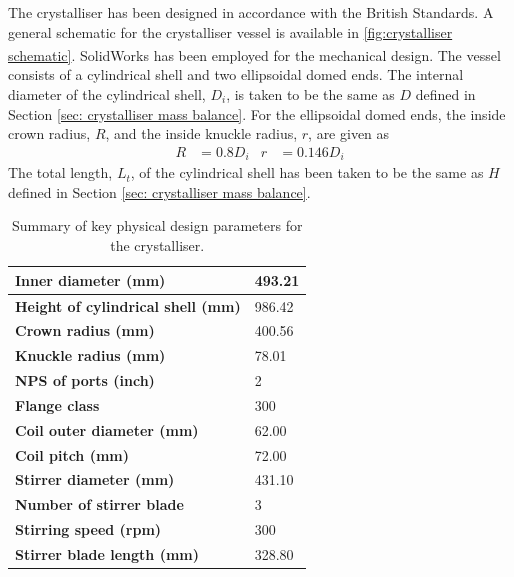 The crystalliser has been designed in accordance with the British Standards. A general schematic for the crystalliser vessel is available in \cref{fig:crystalliser schematic}.  SolidWorks\textsuperscript{\textregistered} has been employed for the mechanical design. The vessel consists of a cylindrical shell and two ellipsoidal domed ends. The internal diameter of the cylindrical shell, $D_i$, is taken to be the same as $D$ defined in Section \ref{sec: crystalliser mass balance}. For the ellipsoidal domed ends, the inside crown radius, $R$, and the inside knuckle radius, $r$, are given as 
\begin{align}
    R &= 0.8 D_i &
    r &= 0.146 D_i
\end{align}
The total length, $L_t$, of the cylindrical shell has been taken to be the same as $H$ defined in Section \ref{sec: crystalliser mass balance}. 

\begin{table}
\centering
\caption{Summary of key physical design parameters for the crystalliser.}
 \label{tab:crystalliser mech design summary}
\begin{tabular}{@{}l|l@{}}
\toprule
\textbf{Inner diameter (mm)}                &    493.21 \\ \midrule
\textbf{Height of cylindrical shell (mm)}   & 986.42 \\ \midrule
\textbf{Crown radius (mm)}                  & 400.56 \\ \midrule
\textbf{Knuckle radius (mm)}                & 78.01 \\ \midrule
\textbf{NPS of ports (inch)}                & 2 \\ \midrule
\textbf{Flange class}                       & 300 \\ \midrule
\textbf{Coil outer diameter (mm)}           & 62.00 \\ \midrule
\textbf{Coil pitch (mm)}                    & 72.00 \\ \midrule
\textbf{Stirrer diameter (mm)}              & 431.10 \\ \midrule
\textbf{Number of stirrer blade}            & 3 \\ \midrule
\textbf{Stirring speed (rpm)}               & 300 \\ \midrule
\textbf{Stirrer blade length (mm)}          & 328.80 \\ \bottomrule
\end{tabular}
\end{table}

